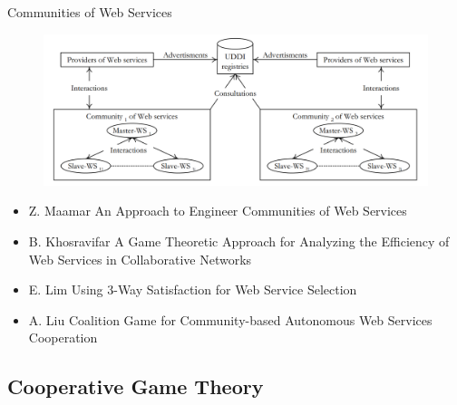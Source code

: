 \documentclass{beamer}
\begin{document}

\begin{frame}{Communities of Web Services}
    \begin{figure}[htbp]
        \centering
        \includegraphics[width=1.0 \columnwidth]{figures/wscommunity2.png}
    \end{figure}

    \tiny
    \begin{itemize}
      \item {\color{blue}\lbrack Z. Maamar\rbrack} An Approach to Engineer Communities of Web Services
      \item {\color{blue}\lbrack B. Khosravifar\rbrack} A Game Theoretic Approach for Analyzing the Efficiency of Web Services in Collaborative Networks
      \item {\color{blue}\lbrack E. Lim\rbrack} Using 3-Way Satisfaction for Web Service Selection
      \item {\color{blue}\lbrack A. Liu\rbrack} Coalition Game for Community-based Autonomous Web Services Cooperation
    \end{itemize}                      	      	
\end{frame}

\subsection{Cooperative Game Theory}
\end{document}
